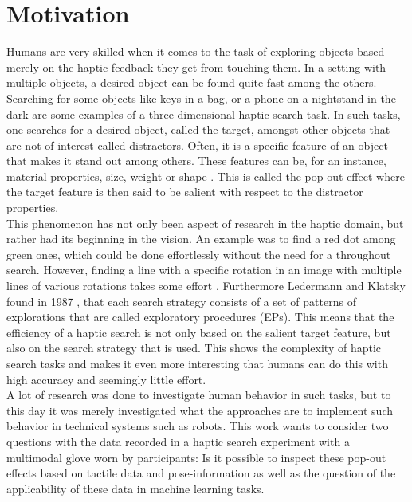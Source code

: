 \section{Motivation}
Humans are very skilled when it comes to the task of exploring objects based merely on the haptic feedback they get from touching them. In a setting with multiple objects, a desired object can be found quite fast among the others. Searching for some objects like keys in a bag, or a phone on a nightstand in the dark are some examples of a three-dimensional haptic search task. In such tasks, one searches for a desired object, called the target, amongst other objects that are not of interest called distractors. Often, it is a specific feature of an object that makes it stand out among others. These features can be, for an instance, material properties, size, weight or shape \cite{HapticShape}. This is called the pop-out effect where the target feature is then said to be salient with respect to the distractor properties. \\
This phenomenon has not only been aspect of research in the haptic domain, but rather had its beginning in the vision. An example was to find a red dot among green ones, which could be done effortlessly without the need for a throughout search. However, finding a line with a specific rotation in an image with multiple lines of various rotations takes some effort \cite{treisman_gormican_1988}. Furthermore Ledermann and Klatsky found in 1987 \cite{EPs}, that each search strategy consists of a set of patterns of explorations that are called exploratory procedures (EPs). This means that the efficiency of a haptic search is not only based on the salient target feature, but also on the search strategy that is used. This shows the complexity of haptic search tasks and makes it even more interesting that humans can do this with high accuracy and seemingly little effort.  \\
A lot of research was done to investigate human behavior in such tasks, but to this day it was merely investigated what the approaches are to implement such behavior in technical systems such as robots. This work wants to consider two questions with the data recorded in a haptic search experiment with a multimodal glove worn by participants: Is it possible to inspect these pop-out effects based on tactile data and pose-information as well as the question of the applicability of these data in machine learning tasks. 

